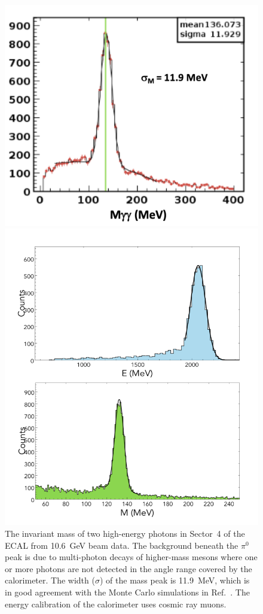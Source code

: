 \documentclass[final,3p]{elsarticle}
\begin{document}
\begin{twocolumn}
\begin{figure}[t!]
\centerline{\includegraphics[width=0.90\columnwidth]{ECAL-2g-mass-fit.png}}
\caption{The invariant mass of two high-energy photons in Sector~4 of the ECAL from 10.6~GeV beam data. The
  background beneath the $\pi^0$ peak is due to multi-photon decays of higher-mass mesons where one or more
  photons are not detected in the angle range covered by the calorimeter. The width ($\sigma$) of the mass peak is
  11.9~MeV, which is in good agreement with the Monte Carlo simulations in Ref.~\cite{Software}. 
  The energy calibration of the calorimeter uses cosmic ray muons.}
\label{gg-ecal}
\centerline{\includegraphics[width=0.90\columnwidth]{FT-performance.png}}

\end{figure}
\end{twocolumn}
\end{document}
